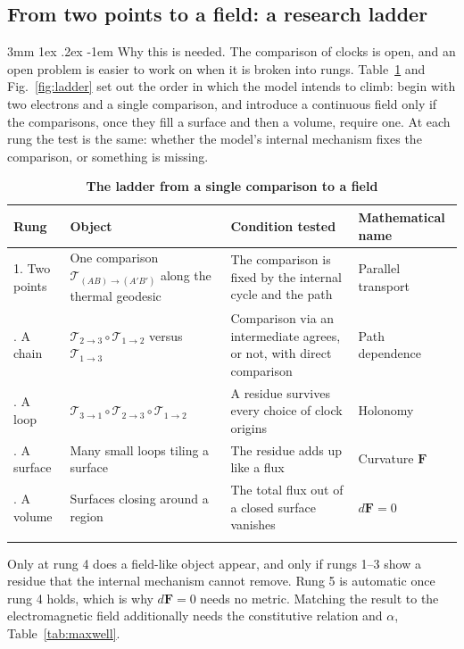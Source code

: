 \documentclass[%
 reprint, amsmath,amssymb, aps, prb, ]{revtex4-2}
\makeatletter
\numberwithin{equation}{section}
\renewcommand\paragraph{%
  \@startsection{paragraph}{4}{\z@}%
    {3mm \@plus 1ex \@minus .2ex}%
    {-1em}%
    {\normalfont\normalsize\itshape}}
\newcommand{\FF}{\mathbf{F}}
\makeatother
\begin{document}
\subsection{From two points to a field: a research ladder}

\paragraph{Why this is needed.} The comparison of clocks is open, and an open problem is easier to work on when it is broken into rungs. Table~\ref{tab:ladder} and Fig.~\ref{fig:ladder} set out the order in which the model intends to climb: begin with two electrons and a single comparison, and introduce a continuous field only if the comparisons, once they fill a surface and then a volume, require one. At each rung the test is the same: whether the model's internal mechanism fixes the comparison, or something is missing.

\begin{table}[t!]
\centering
\caption{\textbf{The ladder from a single comparison to a field}}
\label{tab:ladder}
\renewcommand{\arraystretch}{1.4}
\begin{tabular}{p{2.6cm}p{5.0cm}p{4.2cm}p{3.6cm}}
\toprule
\textbf{Rung} & \textbf{Object} & \textbf{Condition tested} & \textbf{Mathematical name} \\
\midrule
1. Two points
& One comparison $\mathcal{T}_{(AB)\to(A'B')}$ along the thermal geodesic
& The comparison is fixed by the internal cycle and the path
& Parallel transport \\
\addlinespace[0.3cm]
2. A chain
& $\mathcal{T}_{2\to3}\circ\mathcal{T}_{1\to2}$ versus $\mathcal{T}_{1\to3}$
& Comparison via an intermediate agrees, or not, with direct comparison
& Path dependence \\
\addlinespace[0.3cm]
3. A loop
& $\mathcal{T}_{3\to1}\circ\mathcal{T}_{2\to3}\circ\mathcal{T}_{1\to2}$
& A residue survives every choice of clock origins
& Holonomy \\
\addlinespace[0.3cm]
4. A surface
& Many small loops tiling a surface
& The residue adds up like a flux
& Curvature $\FF$ \\
\addlinespace[0.3cm]
5. A volume
& Surfaces closing around a region
& The total flux out of a closed surface vanishes
& $d\FF=0$ \\
\addlinespace[0.2cm]
\bottomrule
\end{tabular}
\vspace{0.2cm}
\begin{minipage}{0.95\textwidth}
\justifying\footnotesize
Only at rung 4 does a field-like object appear, and only if rungs 1--3 show a residue that the internal mechanism cannot remove. Rung 5 is automatic once rung 4 holds, which is why $d\FF=0$ needs no metric. Matching the result to the electromagnetic field additionally needs the constitutive relation and $\alpha$, Table~\ref{tab:maxwell}.
\end{minipage}
\end{table}
\end{document}
